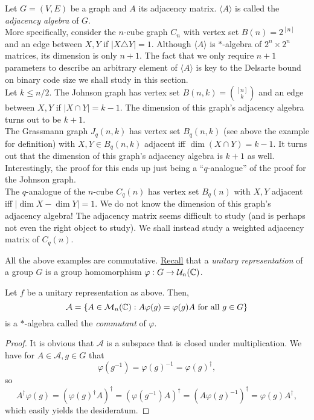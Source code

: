 	\begin{fex}

		Let $G = (V,E)$ be a graph and $A$ its adjacency matrix. $\langle A\rangle$ is called the \emph{adjacency algebra} of $G$. \\

		More specifically, consider the $n$-cube graph $C_n$ with vertex set $B(n)=2^{[n]}$ and an edge between $X,Y$ if $|X \triangle Y| = 1$. Although $\langle A\rangle$ is $*$-algebra of $2^n \times 2^n$ matrices, its dimension is only $n+1$. The fact that we only require $n+1$ parameters to describe an arbitrary element of $\langle A\rangle$ is key to the Delsarte bound on binary code size we shall study in this section.\\

		Let $k \le n/2$. The Johnson graph has vertex set $B(n,k) = \binom{[n]}{k}$ and an edge between $X,Y$ if $|X \cap Y| = k-1$. The dimension of this graph's adjacency algebra turns out to be $k+1$.\\

		The Grassmann graph $J_q(n,k)$ has vertex set $B_q(n,k)$ (see above the example for definition) with $X,Y \in B_q(n,k)$ adjacent iff $\dim(X \cap Y) = k-1$. It turns out that the dimension of this graph's adjacency algebra is $k+1$ as well. Interestingly, the proof for this ends up just being a ``$q$-analogue'' of the proof for the Johnson graph.\\

		The $q$-analogue of the $n$-cube $C_q(n)$ has vertex set $B_q(n)$ with $X,Y$ adjacent iff $|\dim X - \dim Y| = 1$. We do not know the dimension of this graph's adjacency algebra! The adjacency matrix seems difficult to study (and is perhaps not even the right object to study). We shall instead study a weighted adjacency matrix of $C_q(n)$.
	\end{fex}

	All the above examples are commutative. \href{https://amitrajaraman.github.io/notes/rep-th/main.pdf}{Recall} that a \emph{unitary representation} of a group $G$ is a group homomorphism $\varphi : G \to \mathcal{U}_n(\mathbb{C})$.

	\begin{ftheo}
		Let $f$ be a unitary representation as above. Then,
		\[ \mathcal{A} = \{A \in \mathcal{M}_n(\mathbb{C}) : A \varphi(g) = \varphi(g) A \text{ for all } g \in G \} \]
		is a $*$-algebra called the \emph{commutant} of $\varphi$.
	\end{ftheo}
	\begin{proof}
		It is obvious that $\mathcal{A}$ is a subspace that is closed under multiplication. We have for $A \in \mathcal{A}, g \in G$ that
		\[ \varphi(g^{-1}) = \varphi(g)^{-1} = \varphi(g)^\dagger, \]
		so
		\[ A^\dagger \varphi(g) = (\varphi(g)^\dagger A)^\dagger = (\varphi(g^{-1}) A)^\dagger = (A \varphi(g)^{-1})^\dagger = \varphi(g) A^\dagger, \]
		which easily yields the desideratum.
	\end{proof}

